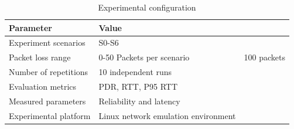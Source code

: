 \begin{table}
\caption{Experimental configuration}
\label{tab:experimental_configuration}
\begin{tabular}{ll}
\toprule
Parameter & Value \\
\midrule
Experiment scenarios & S0-S6 \\
Packet loss range & 0-50%
Packets per scenario & 100 packets \\
Number of repetitions & 10 independent runs \\
Evaluation metrics & PDR, RTT, P95 RTT \\
Measured parameters & Reliability and latency \\
Experimental platform & Linux network emulation environment \\
\bottomrule
\end{tabular}
\end{table}
